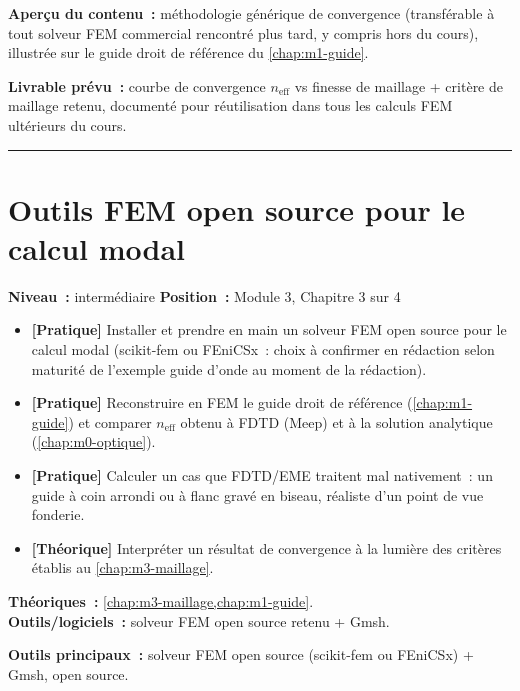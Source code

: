 \noindent\textbf{Aperçu du contenu~:} méthodologie générique de convergence (transférable à tout solveur FEM commercial rencontré plus tard, y compris hors du cours), illustrée sur le guide droit de référence du \cref{chap:m1-guide}.

\noindent\textbf{Livrable prévu~:} courbe de convergence $n_{\text{eff}}$ vs finesse de maillage + critère de maillage retenu, documenté pour réutilisation dans tous les calculs FEM ultérieurs du cours.

\bigskip\hrule\bigskip

\chapter{Outils FEM open source pour le calcul modal}
\label{chap:m3-outils}

\noindent\textbf{Niveau~:} intermédiaire \hfill \textbf{Position~:} Module 3, Chapitre 3 sur 4

\begin{objectifs}
\begin{itemize}[leftmargin=1.4em]
  \item \textbf{[Pratique]} Installer et prendre en main un solveur FEM open source pour le calcul modal (scikit-fem ou FEniCSx~: choix à confirmer en rédaction selon maturité de l'exemple guide d'onde au moment de la rédaction).
  \item \textbf{[Pratique]} Reconstruire en FEM le guide droit de référence (\cref{chap:m1-guide}) et comparer $n_{\text{eff}}$ obtenu à FDTD (Meep) et à la solution analytique (\cref{chap:m0-optique}).
  \item \textbf{[Pratique]} Calculer un cas que FDTD/EME traitent mal nativement~: un guide à coin arrondi ou à flanc gravé en biseau, réaliste d'un point de vue fonderie.
  \item \textbf{[Théorique]} Interpréter un résultat de convergence à la lumière des critères établis au \cref{chap:m3-maillage}.
\end{itemize}
\end{objectifs}

\begin{prerequis}
\textbf{Théoriques~:} \cref{chap:m3-maillage,chap:m1-guide}.\\
\textbf{Outils/logiciels~:} solveur FEM open source retenu + Gmsh.
\end{prerequis}

\noindent\textbf{Outils principaux~:} solveur FEM open source (scikit-fem ou FEniCSx) + Gmsh, open source.

